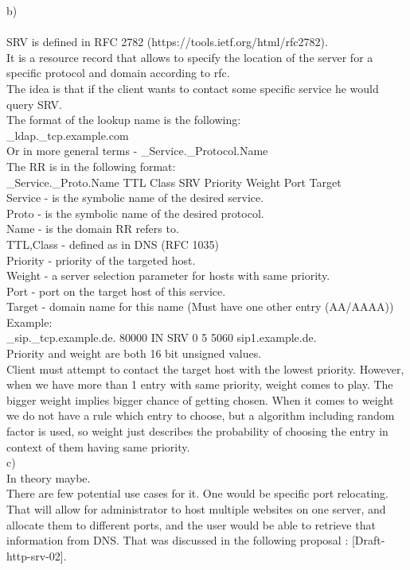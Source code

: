 \documentclass[a4paper]{article}
\begin{document}
b)\\\\
SRV is defined in RFC 2782 (https://tools.ietf.org/html/rfc2782).\\
It is a resource record that allows to specify the location of the server for a specific protocol and domain according to rfc.\\
The idea is that if the client wants to contact some specific service he would query SRV.\\
The format of the lookup name  is the following:\\
\_ldap.\_tcp.example.com\\
Or in more general terms - \_Service.\_Protocol.Name \\
The RR is in the following format:\\
\_Service.\_Proto.Name TTL Class SRV Priority Weight Port Target\\
Service - is the symbolic name of the desired service.\\
Proto - is the symbolic name of the desired protocol.\\
Name - is the domain RR refers to.\\
TTL,Class - defined as in DNS (RFC 1035)\\
Priority - priority of the targeted host.\\
Weight - a server selection parameter for hosts with same priority.\\
Port - port on the target host of this service.\\
Target - domain name for this name (Must have one other entry (AA/AAAA))\\
Example:\\
\_sip.\_tcp.example.de. 80000 IN SRV 0 5 5060 sip1.example.de.\\
Priority and weight are both 16 bit unsigned values. \\
Client must attempt to contact the target host with the lowest priority. However, when we have more than 1 entry with same priority, weight comes to play. The bigger weight implies bigger chance of getting chosen. When it comes to weight we do not have a rule which entry to choose, but a algorithm including random factor is used, so weight just describes the probability of choosing the entry in context of them having same priority.\\
c)\\
In theory maybe. \\
There are few potential use cases for it. One would be specific port relocating. That will allow for administrator to host multiple websites on one server, and allocate them to different ports, and the user would be able to retrieve that information from DNS. That was discussed in the following proposal : \href{https://tools.ietf.org/html/draft-andrews-http-srv-02}[Draft-http-srv-02].\\
\end{document}
